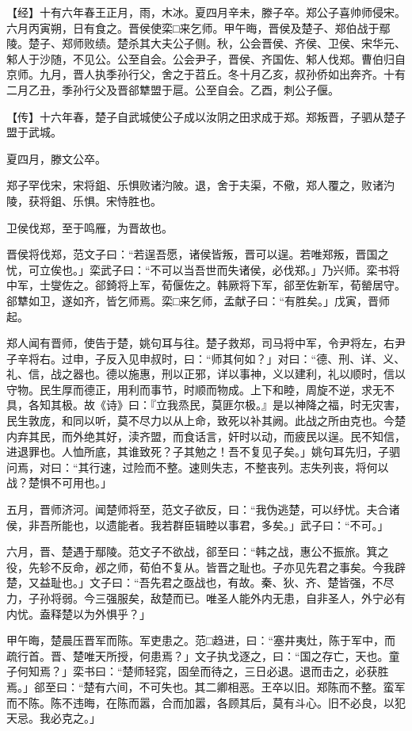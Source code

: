 \documentclass[]{article}
\begin{document}
【经】十有六年春王正月，雨，木冰。夏四月辛未，滕子卒。郑公子喜帅师侵宋。六月丙寅朔，日有食之。晋侯使栾□来乞师。甲午晦，晋侯及楚子、郑伯战于鄢陵。楚子、郑师败绩。楚杀其大夫公子侧。秋，公会晋侯、齐侯、卫侯、宋华元、邾人于沙随，不见公。公至自会。公会尹子，晋侯、齐国佐、邾人伐郑。曹伯归自京师。九月，晋人执季孙行父，舍之于苕丘。冬十月乙亥，叔孙侨如出奔齐。十有二月乙丑，季孙行父及晋郤犨盟于扈。公至自会。乙酉，刺公子偃。

【传】十六年春，楚子自武城使公子成以汝阴之田求成于郑。郑叛晋，子驷从楚子盟于武城。

夏四月，滕文公卒。

郑子罕伐宋，宋将鉏、乐惧败诸汋陂。退，舍于夫渠，不儆，郑人覆之，败诸汋陵，获将鉏、乐惧。宋恃胜也。

卫侯伐郑，至于鸣雁，为晋故也。

晋侯将伐郑，范文子曰：``若逞吾愿，诸侯皆叛，晋可以逞。若唯郑叛，晋国之忧，可立俟也。」栾武子曰：``不可以当吾世而失诸侯，必伐郑。」乃兴师。栾书将中军，士燮佐之。郤錡将上军，荀偃佐之。韩厥将下军，郤至佐新军，荀罃居守。郤犨如卫，遂如齐，皆乞师焉。栾□来乞师，孟献子曰：``有胜矣。」戊寅，晋师起。

郑人闻有晋师，使告于楚，姚句耳与往。楚子救郑，司马将中军，令尹将左，右尹子辛将右。过申，子反入见申叔时，曰：``师其何如？」对曰：``德、刑、详、义、礼、信，战之器也。德以施惠，刑以正邪，详以事神，义以建利，礼以顺时，信以守物。民生厚而德正，用利而事节，时顺而物成。上下和睦，周旋不逆，求无不具，各知其极。故《诗》曰：『立我烝民，莫匪尔极。』是以神降之福，时无灾害，民生敦庞，和同以听，莫不尽力以从上命，致死以补其阙。此战之所由克也。今楚内弃其民，而外绝其好，渎齐盟，而食话言，奸时以动，而疲民以逞。民不知信，进退罪也。人恤所底，其谁致死？子其勉之！吾不复见子矣。」姚句耳先归，子驷问焉，对曰：``其行速，过险而不整。速则失志，不整丧列。志失列丧，将何以战？楚惧不可用也。」

五月，晋师济河。闻楚师将至，范文子欲反，曰：``我伪逃楚，可以纾忧。夫合诸侯，非吾所能也，以遗能者。我若群臣辑睦以事君，多矣。」武子曰：``不可。」

六月，晋、楚遇于鄢陵。范文子不欲战，郤至曰：``韩之战，惠公不振旅。箕之役，先轸不反命，邲之师，荀伯不复从。皆晋之耻也。子亦见先君之事矣。今我辟楚，又益耻也。」文子曰：``吾先君之亟战也，有故。秦、狄、齐、楚皆强，不尽力，子孙将弱。今三强服矣，敌楚而已。唯圣人能外内无患，自非圣人，外宁必有内忧。盍释楚以为外惧乎？」

甲午晦，楚晨压晋军而陈。军吏患之。范□趋进，曰：``塞井夷灶，陈于军中，而疏行首。晋、楚唯天所授，何患焉？」文子执戈逐之，曰：``国之存亡，天也。童子何知焉？」栾书曰：``楚师轻窕，固垒而待之，三日必退。退而击之，必获胜焉。」郤至曰：``楚有六间，不可失也。其二卿相恶。王卒以旧。郑陈而不整。蛮军而不陈。陈不违晦，在陈而嚣，合而加嚣，各顾其后，莫有斗心。旧不必良，以犯天忌。我必克之。」
\end{document}
